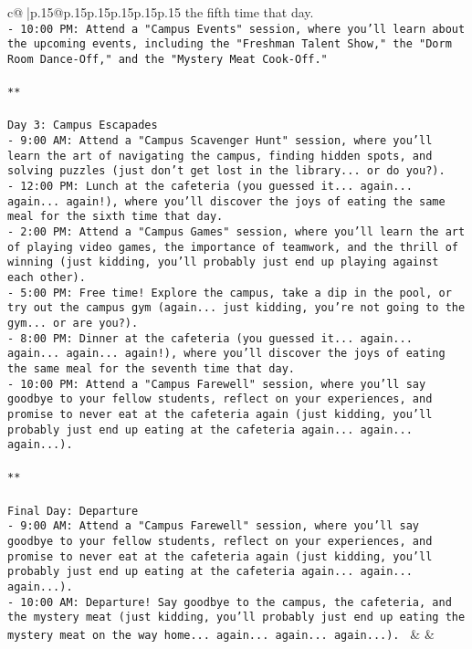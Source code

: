 \documentclass{article}
\begin{document}
{\begin{supertabular}{c@{$\;$}|p{.15\linewidth}@{}p{.15\linewidth}p{.15\linewidth}p{.15\linewidth}p{.15\linewidth}p{.15\linewidth}}
{{{the fifth time that day.\\ \tt - 10:00 PM: Attend a "Campus Events" session, where you'll learn about the upcoming events, including the "Freshman Talent Show," the "Dorm Room Dance-Off," and the "Mystery Meat Cook-Off."\\ \tt \\ \tt ***\\ \tt \\ \tt Day 3: Campus Escapades\\ \tt - 9:00 AM: Attend a "Campus Scavenger Hunt" session, where you'll learn the art of navigating the campus, finding hidden spots, and solving puzzles (just don't get lost in the library... or do you?).\\ \tt - 12:00 PM: Lunch at the cafeteria (you guessed it... again... again... again!), where you'll discover the joys of eating the same meal for the sixth time that day.\\ \tt - 2:00 PM: Attend a "Campus Games" session, where you'll learn the art of playing video games, the importance of teamwork, and the thrill of winning (just kidding, you'll probably just end up playing against each other).\\ \tt - 5:00 PM: Free time! Explore the campus, take a dip in the pool, or try out the campus gym (again... just kidding, you're not going to the gym... or are you?).\\ \tt - 8:00 PM: Dinner at the cafeteria (you guessed it... again... again... again... again!), where you'll discover the joys of eating the same meal for the seventh time that day.\\ \tt - 10:00 PM: Attend a "Campus Farewell" session, where you'll say goodbye to your fellow students, reflect on your experiences, and promise to never eat at the cafeteria again (just kidding, you'll probably just end up eating at the cafeteria again... again... again...).\\ \tt \\ \tt ***\\ \tt \\ \tt Final Day: Departure\\ \tt - 9:00 AM: Attend a "Campus Farewell" session, where you'll say goodbye to your fellow students, reflect on your experiences, and promise to never eat at the cafeteria again (just kidding, you'll probably just end up eating at the cafeteria again... again... again...).\\ \tt - 10:00 AM: Departure! Say goodbye to the campus, the cafeteria, and the mystery meat (just kidding, you'll probably just end up eating the mystery meat on the way home... again... again... again...). 
	  } 
	   } 
	   } 
	 & & \\ 
 


\end{supertabular}}
\end{document}
